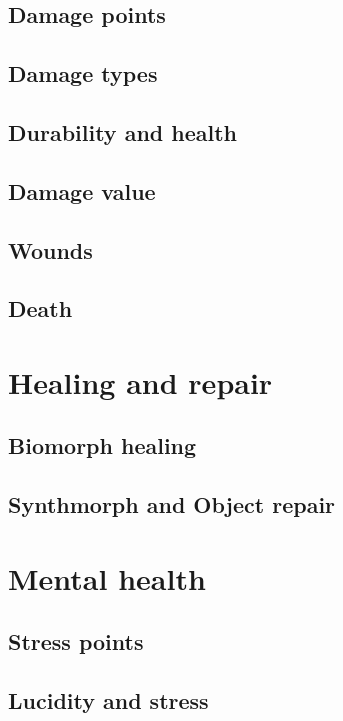 \subsection{Damage points}

\subsection{Damage types}

\subsection{Durability and health}

\subsection{Damage value}

\subsection{Wounds}

\subsection{Death}

\section{Healing and repair}
\label{sec:healing-repair}

\subsection{Biomorph healing}

\subsection{Synthmorph and Object repair}

\section{Mental health}
\label{sec:mental-health}

\subsection{Stress points}

\subsection{Lucidity and stress}

